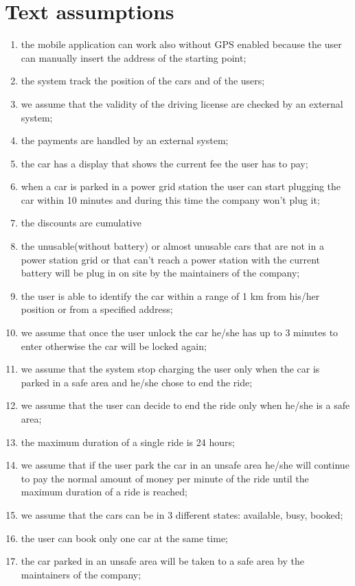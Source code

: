 \section{Text assumptions}
\begin{enumerate}
	\item the mobile application can work also without GPS enabled because the user can manually insert the address of the starting point;
	\item the system track the position of the cars and of the users;
	\item we assume that the validity of the driving license are checked by an external system;
	\item the payments are handled by an external system;
	\item the car has a display that shows the current fee the user has to pay;
	\item when a car is parked in a power grid station the user can start plugging the car within 10 minutes and during this time the company won't plug it;
	\item the discounts are cumulative
	\item the unusable(without battery) or almost unusable cars that are not in a power station grid or that can't reach a power station with the current battery will be plug in on site by the maintainers of the company;
	\item the user is able to identify the car within a range of 1 km from his/her position or from a specified address;
	\item we assume that once the user unlock the car he/she has up to 3 minutes to enter otherwise the car will be locked again;
	\item we assume that the system stop charging the user only when the car is parked in a safe area and he/she chose to end the ride;
	\item we assume that the user can decide to end the ride only when he/she is a safe area;
	\item the maximum duration of a single ride is 24 hours;
	\item we assume that if the user park the car in an unsafe area he/she will continue to pay the normal amount of money per minute of the ride until the maximum duration of a ride is reached;
	\item we assume that the cars can be in 3 different states: available, busy, booked;
	\item the user can book only one car at the same time;
	\item the car parked in an unsafe area will be taken to a safe area by the maintainers of the company;

\end{enumerate}
